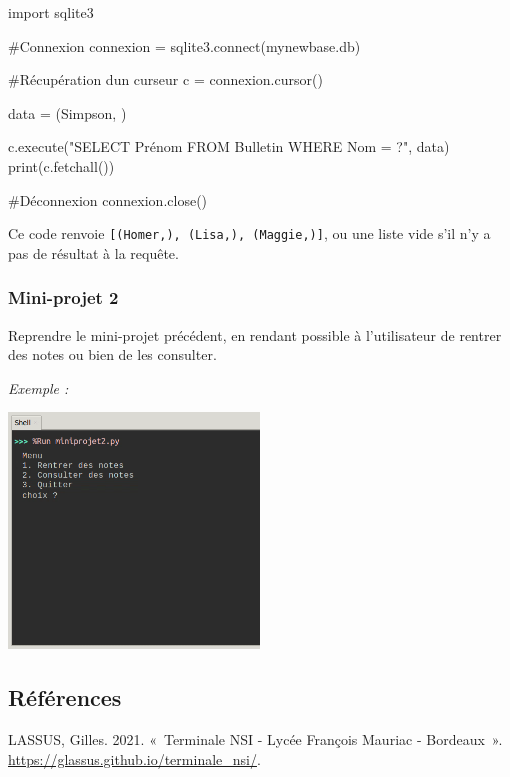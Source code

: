 \documentclass[
  a4paper,
  DIV=11,
  numbers=noendperiod]{scrartcl}
\newenvironment{Shaded}{\begin{snugshade}}{\end{snugshade}}
\newcommand{\BuiltInTok}[1]{\textcolor[rgb]{0.00,0.23,0.31}{#1}}
\newcommand{\CommentTok}[1]{\textcolor[rgb]{0.37,0.37,0.37}{#1}}
\newcommand{\ExtensionTok}[1]{\textcolor[rgb]{0.00,0.23,0.31}{#1}}
\newcommand{\ImportTok}[1]{\textcolor[rgb]{0.00,0.46,0.62}{#1}}
\newcommand{\NormalTok}[1]{\textcolor[rgb]{0.00,0.23,0.31}{#1}}
\newcommand{\OperatorTok}[1]{\textcolor[rgb]{0.37,0.37,0.37}{#1}}
\newcommand{\StringTok}[1]{\textcolor[rgb]{0.13,0.47,0.30}{#1}}
\newlength{\cslhangindent}
\newlength{\cslentryspacingunit} %
\newenvironment{CSLReferences}[2] %
 {%
  \setlength{\parindent}{0pt}
  \ifodd #1
  \let\oldpar\par
  \def\par{\hangindent=\cslhangindent\oldpar}
  \fi
  \setlength{\parskip}{#2\cslentryspacingunit}
 }%
 {}
\begin{document}
\begin{Shaded}
\begin{Highlighting}[]
\ImportTok{import}\NormalTok{ sqlite3}

\CommentTok{\#Connexion}
\NormalTok{connexion }\OperatorTok{=}\NormalTok{ sqlite3.}\ExtensionTok{connect}\NormalTok{(}\StringTok{\textquotesingle{}mynewbase.db\textquotesingle{}}\NormalTok{)}

\CommentTok{\#Récupération d\textquotesingle{}un curseur}
\NormalTok{c }\OperatorTok{=}\NormalTok{ connexion.cursor()}

\NormalTok{data }\OperatorTok{=}\NormalTok{ (}\StringTok{\textquotesingle{}Simpson\textquotesingle{}}\NormalTok{, )}

\NormalTok{c.execute(}\StringTok{"SELECT Prénom FROM Bulletin WHERE Nom = ?"}\NormalTok{, data)}
\BuiltInTok{print}\NormalTok{(c.fetchall())  }


\CommentTok{\#Déconnexion}
\NormalTok{connexion.close()}
\end{Highlighting}
\end{Shaded}

Ce code renvoie
\texttt{{[}(\textquotesingle{}Homer\textquotesingle{},),\ (\textquotesingle{}Lisa\textquotesingle{},),\ (\textquotesingle{}Maggie\textquotesingle{},){]}},
ou une liste vide s'il n'y a pas de résultat à la requête.

\hypertarget{mini-projet-2}{%
\subsubsection{Mini-projet 2}\label{mini-projet-2}}

Reprendre le mini-projet précédent, en rendant possible à l'utilisateur
de rentrer des notes ou bien de les consulter.

\emph{Exemple :}

\includegraphics[width=0.5\textwidth]{TP3_1-0.png}

\hypertarget{ruxe9fuxe9rences}{%
\subsection*{Références}\label{ruxe9fuxe9rences}}

\hypertarget{refs}{}
\begin{CSLReferences}{1}{0}
\leavevmode{}%
LASSUS, Gilles. 2021. {«~Terminale NSI - Lycée François Mauriac -
Bordeaux~»}. \url{https://glassus.github.io/terminale_nsi/}.

\end{CSLReferences}
\end{document}
